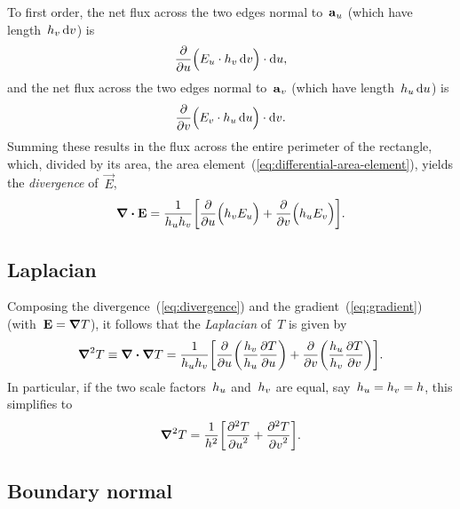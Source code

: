 To first order,
the net flux across the two edges normal to~$\mathop{}\!\boldsymbol{\mathrm{a}}_{u}$
(which have length~$\scalefac[v] \td v$) is
\[
  \pder{}{u} \roundbr[\Big]{
    \comp{E}{u} \cdot \scalefac[v] \td v
  } \cdot \td u,
\]
and the net flux across the two edges normal to~$\mathop{}\!\boldsymbol{\mathrm{a}}_{v}$
(which have length~$\scalefac[u] \td u$) is
\[
  \pder{}{v} \roundbr[\Big]{
    \comp{E}{v} \cdot \scalefac[u] \td u
  } \cdot \td v.
\]
Summing these results in the flux across the entire perimeter of the rectangle,
which, divided by its area,
the area element~(\ref{eq:differential-area-element}),
yields the \emph{divergence} of~$\vec{E}$,
\begin{equation}
  \del \dotp \vec{E} =
    \frac{1}{\scalefac[u] \scalefac[v]}
    \squarebr*{
      \pder{}{u} \roundbr[\Big]{\scalefac[v] \comp{E}{u}}
        +
      \pder{}{v} \roundbr[\Big]{\scalefac[u] \comp{E}{v}}
    }.
  \label{eq:divergence}
\end{equation}

\subsection{Laplacian}
\label{sec:curvilinear.calculus.laplacian}

Composing the divergence~(\ref{eq:divergence})
and the gradient~(\ref{eq:gradient}) (with~$\boldsymbol{\mathrm{E}} = \mathop{}\!\boldsymbol{\mathrm{\nabla}} T$),
it follows that the \emph{Laplacian} of~$T$ is given by
\begin{equation}
  \del^2 T \defeq \del \dotp \del T =
    \frac{1}{\scalefac[u] \scalefac[v]}
    \squarebr*{
      \pder{}{u} \roundbr*{\frac{\scalefac[v]}{\scalefac[u]} \pder{T}{u}}
        +
      \pder{}{v} \roundbr*{\frac{\scalefac[u]}{\scalefac[v]} \pder{T}{v}}
    }.
  \label{eq:laplacian}
\end{equation}
In particular,
if the two scale factors~$\scalefac[u]$ and~$\scalefac[v]$ are equal,
say~$\scalefac[u] = \scalefac[v] = \scalefac$,
this simplifies to
\begin{equation}
  \del^2 T =
    \frac{1}{\scalefac^2}
    \squarebr*{\pder[2]{T}{u} + \pder[2]{T}{v}}.
  \label{eq:laplacian-scale-factors-equal}
\end{equation}

\subsection{Boundary normal}
\label{sec:curvilinear.calculus.normal}

